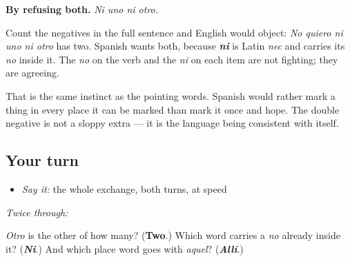 \begin{culture}
\textbf{By refusing both.} \emph{Ni uno ni otro.}

Count the negatives in the full sentence and English would object: \emph{No quiero ni uno ni otro} has two. Spanish wants both, because \emph{\textbf{ni}} is Latin \emph{nec} and carries its \emph{no} inside it. The \emph{no} on the verb and the \emph{ni} on each item are not fighting; they are agreeing.

That is the same instinct as the pointing words. Spanish would rather mark a thing in every place it can be marked than mark it once and hope. The double negative is not a sloppy extra — it is the language being consistent with itself.
\end{culture}

\subsection*{Your turn}
\begin{itemize}
\raggedright
  \item \emph{Say it:} the whole exchange, both turns, at speed
\end{itemize}

\emph{Twice through:}

\begin{tcolorbox}[breakable,colback=teal!4,colframe=teal!35!black,title={Before you move on}]
\emph{Otro} is the other of how many? (\textbf{Two}.) Which word carries a \emph{no} already inside it? (\emph{\textbf{Ni}}.) And which place word goes with \emph{aquel}? (\emph{\textbf{Allí}}.)
\end{tcolorbox}
